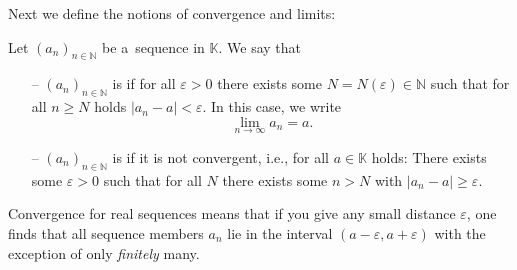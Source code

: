 

Next we define the notions of convergence and limits:
\begin{Definition}\label{def:convlim}
    Let $(a_n)_{n\in\mathbb{N}}$ be a~sequence in $\mathbb{K}$. We say that
\begin{itemize}
 \item[--] $(a_n)_{n\in\mathbb{N}}$ is  if for all $\varepsilon>0$ there exists some $N=N(\varepsilon)\in\mathbb{N}$ such that for all $n\geq N$ holds $|a_n-a|<\varepsilon$. In this case, we write
\[\lim_{n\to\infty}a_n=a.\]
 \item[--] $(a_n)_{n\in\mathbb{N}}$ is  if it is not convergent, i.e., for all $a\in \mathbb{K}$ holds: There exists some $\varepsilon>0$ such that for all $N$ there exists some $n>N$ with $|a_n-a|\geq\varepsilon$.
\end{itemize}

\end{Definition}

Convergence for real sequences means that if you give any small distance $\varepsilon$, one
finds that all sequence members $a_n$ lie in the interval $(a-\varepsilon, a+\varepsilon)$ with the exception of only \emph{finitely} many.

%  

